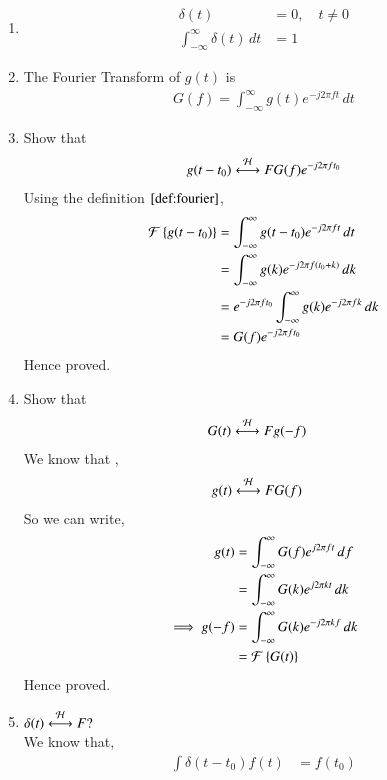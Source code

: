 \documentclass[journal,12pt,twocolumn]{IEEEtran}
\renewcommand\thesection{\arabic{section}}
\begin{document}
\begin{enumerate}[label=\thesection.\arabic*
,ref=\thesection.\theenumi]
\item 
	\begin{align}
		\delta(t)&=0, \quad t\neq0
\\
		\int_{-\infty}^{\infty}\delta(t) \, dt&= 1
	\end{align}
 \item The Fourier Transform of $g(t)$ is
 \begin{align}
	 G(f)=\int_{-\infty}^{\infty}g(t)e^{-j2\pi ft}\,dt\label{def:fourier}
 \end{align}
 \item Show that 
 \begin{align}
	 g(t-t_0)&\overset{\mathcal{H}}{ \longleftrightarrow}{F}G(f)e^{-j2\pi ft_0}\\
 \end{align}
 \solution Using the definition $\eqref{def:fourier}$,
   \begin{align}
	   \mathcal{F}\left\{g(t-t_0)\right\} &= \int_{-\infty}^{\infty}g(t-t_0)e^{-j2\pi ft}\,dt \\
	                               &= \int_{-\infty}^{\infty}g(k)e^{-j2\pi f\left(t_0 + k\right)} \, dk \\
				       &= e^{-j2\pi ft_0} \int_{-\infty}^{\infty}g(k)e^{-j2\pi fk} \, dk \\
				       &= G(f)e^{-j2\pi ft_0}
   \end{align}
   Hence proved.
 \item Show that 
 \begin{align}
	 G(t)&\overset{\mathcal{H}}{ \longleftrightarrow}{F}g(-f)
 \end{align}
  \solution We know that ,
    \begin{align}
	g(t) &\overset{\mathcal{H}}{ \longleftrightarrow}{F}G(f)
    \end{align}
    So we can write,
     \begin{align}
	g(t) &= \int_{-\infty}^{\infty}G(f)e^{j 2\pi ft} \, df \\
	     &= \int_{-\infty}^{\infty}G(k) e^{j 2 \pi kt} \, dk \\
	\implies g(-f) &= \int_{-\infty}^{\infty} G(k) e^{-j 2 \pi kf} \, dk \\
	               &= \mathcal{F}\left\{G(t)\right\}
     \end{align}
     Hence proved.
 \item $\delta(t)\overset{\mathcal{H}}{ \longleftrightarrow}{F}?$ \\
   \solution We know that,
     \begin{align}
	 \int \delta(t-t_0)f(t) &= f(t_0)
      \end{align}

\end{enumerate}
\end{document}
